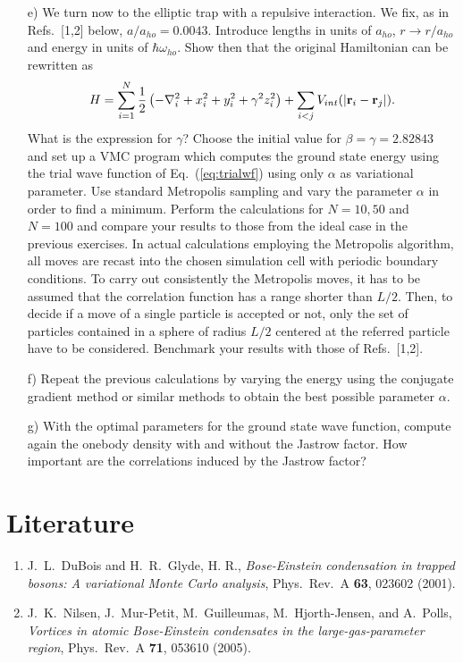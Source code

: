 \documentclass[10pt]{article}
\begin{document}
\begin{enumerate}
 \item[e)] We turn now to the elliptic trap with a repulsive
   interaction.  We fix, as in Refs.~[1,2] below,
   $a/a_{ho}=0.0043$. Introduce lengths in units of $a_{ho}$,
   $r\rightarrow r/a_{ho}$ and energy in units of $\hbar\omega_{ho}$.
   Show then that the original Hamiltonian can be rewritten as
 \[ 
    H=\sum_{i=1}^N\frac{1}{2}\left(-\nabla^2_i+x_i^2+y_i^2+\gamma^2z_i^2\right)+\sum_{i<j}V_{int}(|{\bf r}_i-{\bf r}_j|).
 \]
 What is the expression for $\gamma$?  Choose the initial value for
 $\beta=\gamma = 2.82843$ and set up a VMC program which computes the
 ground state energy using the trial wave function of
 Eq.~(\ref{eq:trialwf})  using only $\alpha$ as variational
 parameter.  Use standard Metropolis sampling and vary the parameter
 $\alpha$ in order to find a minimum. Perform the calculations for
 $N=10,50$ and $N=100$ and compare your results to those from the
 ideal case in the previous exercises.  In actual calculations
 employing the Metropolis algorithm, all moves are recast into the
 chosen simulation cell with periodic boundary conditions. To carry
 out consistently the Metropolis moves, it has to be assumed that the
 correlation function has a range shorter than $L/2$. Then, to decide
 if a move of a single particle is accepted or not, only the set of
 particles contained in a sphere of radius $L/2$ centered at the
 referred particle have to be considered.  Benchmark your results with
 those of Refs.~[1,2].

\item[f)]  Repeat the previous calculations by varying the energy using the
conjugate gradient method or similar methods to obtain the best possible parameter
$\alpha$. 


\item[g)] With the optimal parameters for the ground state wave
  function, compute again the onebody density with and without the Jastrow
factor.  How important are the correlations induced by the Jastrow factor?


\end{enumerate}

\section*{Literature}
\begin{enumerate}
\item J.~L.~DuBois and H.~R.~Glyde, H. R., {\em Bose-Einstein condensation in trapped bosons: A variational Monte Carlo analysis},
Phys.~Rev.~A {\bf 63}, 023602 (2001).

\item J.~K.~Nilsen,  J.~Mur-Petit, M.~Guilleumas, M.~Hjorth-Jensen, and A.~Polls, {\em Vortices in atomic Bose-Einstein condensates in the large-gas-parameter region},
Phys.~Rev.~A {\bf 71}, 053610 (2005).

\end{enumerate}
\end{document}
